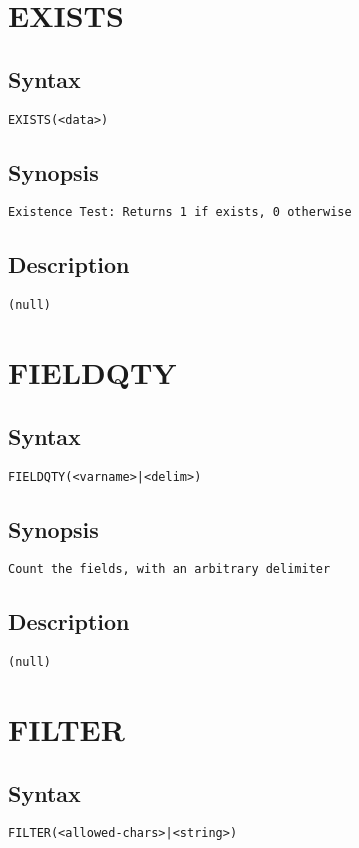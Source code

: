 \section{EXISTS}
\subsection{Syntax}
\begin{verbatim}
EXISTS(<data>)
\end{verbatim}
\subsection{Synopsis}
\begin{verbatim}
Existence Test: Returns 1 if exists, 0 otherwise
\end{verbatim}
\subsection{Description}
\begin{verbatim}
(null)
\end{verbatim}


\section{FIELDQTY}
\subsection{Syntax}
\begin{verbatim}
FIELDQTY(<varname>|<delim>)
\end{verbatim}
\subsection{Synopsis}
\begin{verbatim}
Count the fields, with an arbitrary delimiter
\end{verbatim}
\subsection{Description}
\begin{verbatim}
(null)
\end{verbatim}


\section{FILTER}
\subsection{Syntax}
\begin{verbatim}
FILTER(<allowed-chars>|<string>)
\end{verbatim}
